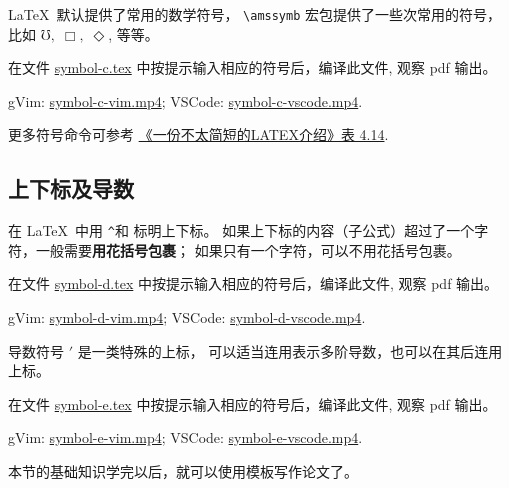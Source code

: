 \documentclass[
    11pt,
    base=hide,
    cite=authoryear,
    device=phone,
    lang=cn,
    mode=simple,
    result=answer,
    toc=onecol,
]{elegantbook_sierxue}
\begin{document}
\LaTeX\ 默认提供了常用的数学符号，
\lstinline{\amssymb} 宏包提供了一些次常用的符号，比如
\(\mho,\;\Box,\;\Diamond\), 等等。
\begin{exercise}\label{ex:symbol-c}
    在文件
    \href{learn-latex/basic-03/symbol-c.tex}{symbol-c.tex}
    中按提示输入相应的符号后，编译此文件, 观察 pdf 输出。
\end{exercise}
\begin{cast}\label{cast:symbol-c}
    gVim: \href{media/casts/symbol-c-vim.mp4}{symbol-c-vim.mp4};
    VSCode: \href{media/casts/symbol-c-vscode.mp4}{symbol-c-vscode.mp4}.
\end{cast}
更多符号命令可参考
\hyperlink{books/lshort-zh-cn.pdf.69}%
{《一份不太简短的LATEX介绍》表 4.14}.


\subsection{上下标及导数}%
\label{sub:sup_sub_scripts}

在 \LaTeX\ 中用 \texttt\textasciicircum 和 \texttt\textunderscore 标明上下标。
如果上下标的内容（子公式）超过了一个字符，一般需要\textbf{用花括号包裹}；
如果只有一个字符，可以不用花括号包裹。

\begin{exercise}\label{ex:symbol-d}
    在文件
    \href{learn-latex/basic-03/symbol-d.tex}{symbol-d.tex}
    中按提示输入相应的符号后，编译此文件, 观察 pdf 输出。
\end{exercise}
\begin{cast}\label{cast:symbol-d}
    gVim: \href{media/casts/symbol-d-vim.mp4}{symbol-d-vim.mp4};
    VSCode: \href{media/casts/symbol-d-vscode.mp4}{symbol-d-vscode.mp4}.
\end{cast}

导数符号 ${}'$ 是一类特殊的上标，
可以适当连用表示多阶导数，也可以在其后连用上标。

\begin{exercise}\label{ex:symbol-e}
    在文件
    \href{learn-latex/basic-03/symbol-e.tex}{symbol-e.tex}
    中按提示输入相应的符号后，编译此文件, 观察 pdf 输出。
\end{exercise}
\begin{cast}\label{cast:symbol-e}
    gVim: \href{media/casts/symbol-e-vim.mp4}{symbol-e-vim.mp4};
    VSCode: \href{media/casts/symbol-e-vscode.mp4}{symbol-e-vscode.mp4}.
\end{cast}

本节的基础知识学完以后，就可以使用模板写作论文了。
\end{document}
